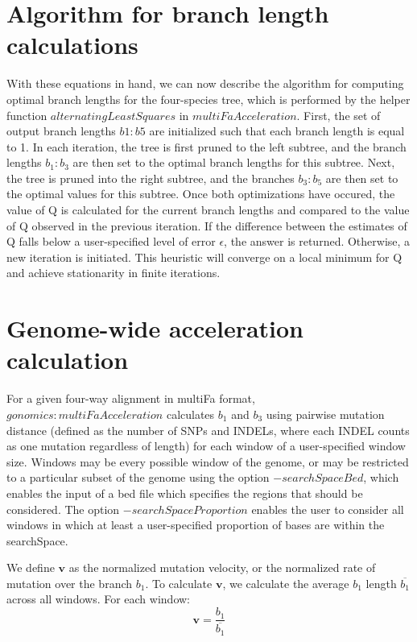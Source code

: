 \documentclass{article} %
\begin{document}
\section{Algorithm for branch length calculations}
With these equations in hand, we can now describe the algorithm for computing optimal branch lengths for the four-species tree, which is performed by the helper function $alternatingLeastSquares$ in $multiFaAcceleration$. First, the set of output branch lengths $b1: b5$ are initialized such that each branch length is equal to 1. In each iteration, the tree is first pruned to the left subtree, and the branch lengths $b_1:b_3$ are then set to the optimal branch lengths for this subtree. Next, the tree is pruned into the right subtree, and the branches $b_3:b_5$ are then set to the optimal values for this subtree. Once both optimizations have occured, the value of Q is calculated for the current branch lengths and compared to the value of Q observed in the previous iteration. If the difference between the estimates of Q falls below a user-specified level of error $\epsilon$, the answer is returned. Otherwise, a new iteration is initiated. This heuristic will converge on a local minimum for Q and achieve stationarity in finite iterations.

\section{Genome-wide acceleration calculation}
For a given four-way alignment in multiFa format, $gonomics:multiFaAcceleration$ calculates $b_1$ and $b_3$ using pairwise mutation distance (defined as the number of SNPs and INDELs, where each INDEL counts as one mutation regardless of length) for each window of a user-specified window size. Windows may be every possible window of the genome, or may be restricted to a particular subset of the genome using the option $-searchSpaceBed$, which enables the input of a bed file which specifies the regions that should be considered. The option $-searchSpaceProportion$ enables the user to consider all windows in which at least a user-specified proportion of bases are within the searchSpace.

We define $\textbf{v}$ as the normalized mutation velocity, or the normalized rate of mutation over the branch $b_1$. To calculate $\textbf{v}$, we calculate the average $b_1$ length $\overline{b_1}$ across all windows. For each window:
\begin{equation*}
	\textbf{v} = \frac{b_1}{\overline{b_1}}
\end{equation*}
\end{document}
